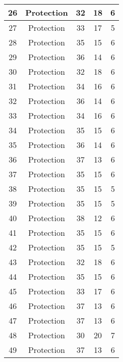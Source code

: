 \documentclass[results.tex]{subfiles}
\begin{document}
\begin{center}
\begin{tabular}{| c || c | c | c | c |}
    \hline
    26 & Protection & 32 & 18 & 6 \\ 
    \hline
    27 & Protection & 33 & 17 & 5 \\ 
    \hline
    28 & Protection & 35 & 15 & 6 \\ 
    \hline
    29 & Protection & 36 & 14 & 6 \\ 
    \hline
    30 & Protection & 32 & 18 & 6 \\ 
    \hline
    31 & Protection & 34 & 16 & 6 \\ 
    \hline
    32 & Protection & 36 & 14 & 6 \\ 
    \hline
    33 & Protection & 34 & 16 & 6 \\ 
    \hline
    34 & Protection & 35 & 15 & 6 \\ 
    \hline
    35 & Protection & 36 & 14 & 6 \\ 
    \hline
    36 & Protection & 37 & 13 & 6 \\ 
    \hline
    37 & Protection & 35 & 15 & 6 \\ 
    \hline
    38 & Protection & 35 & 15 & 5 \\ 
    \hline
    39 & Protection & 35 & 15 & 5 \\ 
    \hline
    40 & Protection & 38 & 12 & 6 \\ 
    \hline
    41 & Protection & 35 & 15 & 6 \\ 
    \hline
    42 & Protection & 35 & 15 & 5 \\ 
    \hline
    43 & Protection & 32 & 18 & 6 \\ 
    \hline
    44 & Protection & 35 & 15 & 6 \\ 
    \hline
    45 & Protection & 33 & 17 & 6 \\ 
    \hline
    46 & Protection & 37 & 13 & 6 \\ 
    \hline
    47 & Protection & 37 & 13 & 6 \\ 
    \hline
    48 & Protection & 30 & 20 & 7 \\ 
    \hline
    49 & Protection & 37 & 13 & 6 \\ 
    \hline   \end{tabular}
\end{center}
\end{document}
